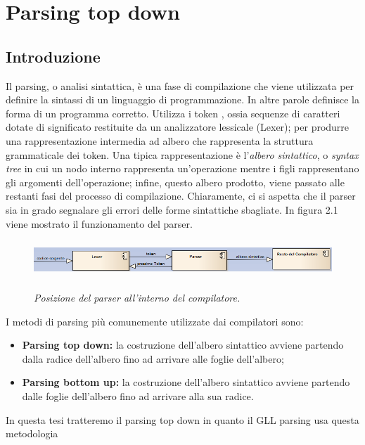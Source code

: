 \chapter{Parsing top down}
\section{Introduzione}
Il parsing, o analisi sintattica, è una fase di compilazione  che viene utilizzata per definire la sintassi di un linguaggio di programmazione. In altre parole definisce la forma di un programma corretto. Utilizza i token \cite{libro: compilatori}, ossia sequenze di caratteri dotate di significato restituite da un analizzatore lessicale (Lexer); per produrre una rappresentazione intermedia ad albero che rappresenta la struttura grammaticale dei token. Una tipica rappresentazione è l'\textit{albero sintattico}, o \textit{syntax tree} in cui un nodo interno rappresenta un'operazione mentre i figli rappresentano gli argomenti dell'operazione; infine, questo albero prodotto, viene passato alle restanti fasi del processo di compilazione. Chiaramente, ci si aspetta che il parser sia in grado segnalare gli errori delle forme sintattiche sbagliate. In figura 2.1 viene mostrato il funzionamento del parser.
\par
\vspace{0.5mm}
\begin{figure}[hbpb]\label{figParser}
	{\includegraphics[height=40pt,width=420pt,scale=0.1]{parser.png}}
	\caption{\textit{Posizione del parser all'interno del compilatore.}}
\end{figure}
I metodi di parsing più comunemente utilizzate dai compilatori sono:
\begin{itemize}
	\item \textbf{Parsing top down: }la costruzione dell'albero sintattico avviene partendo dalla radice dell'albero fino ad arrivare alle foglie dell'albero;
	\item \textbf{Parsing bottom up: }la costruzione dell'albero sintattico avviene partendo dalle foglie dell'albero fino ad arrivare alla sua radice.
\end{itemize}
In questa tesi tratteremo il parsing top down in quanto il GLL parsing usa questa metodologia
